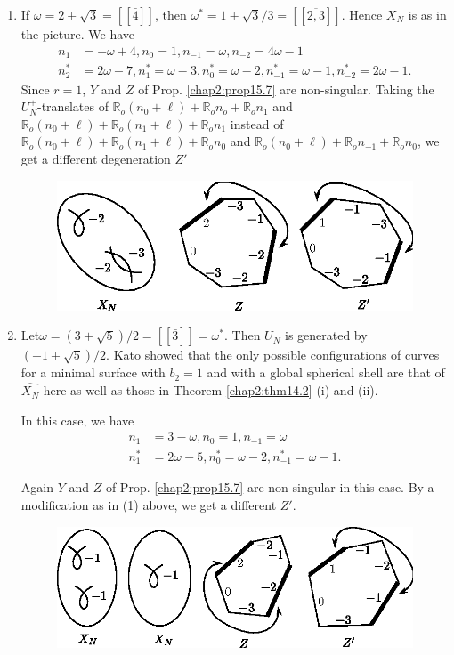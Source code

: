 \begin{examples*}
\begin{enumerate}[(1)]
\item If $\omega =2 + \sqrt{3}=[[\bar{4}]]$, then $\omega^*=1+
  \sqrt{3}/3=[[\overline{2,3}]]$. Hence $X_N$ is as in the picture. We
  have 
\begin{align*}
n_1 & = -\omega +4, n_0=1,n_{-1}=\omega, n_{-2}=4 \omega -1\\
n^*_2 & = 2 \omega-7, n^*_1=\omega-3, n^*_0=\omega-2, n^*_{-1}=\omega-1,
n^*_{-2}=2 \omega -1. 
\end{align*}
Since $r=1$, $Y$ and $Z$ of Prop. \ref{chap2:prop15.7} are
non-singular. Taking the 
$U^+_N$-translates of $\mathbb{R}_o(n_0+
\ell)+\mathbb{R}_on_o+\mathbb{R}_on_1$ and $\mathbb{R}_o(n_0+
\ell)+\mathbb{R}_o(n_1+\ell)+\mathbb{R}_on_1$ instead of
$\mathbb{R}_o(n_0+ \ell)+\mathbb{R}_o(n_1+ \ell)+\mathbb{R}_on_0$ and
$\mathbb{R}_o(n_0+\ell)+\mathbb{R}_on_{-1}+\mathbb{R}_on_0$, we get a
different degeneration $Z'$  
\begin{figure}[H]
\centering 
\includegraphics{vol58-fig/fig58-84.eps} 
\end{figure}

\item Let\pageoriginale $\omega = (3 + \sqrt{5}) /2 = [[\bar{3}]] =
  \omega^*$. Then $U_N$ is generated by $(-1 +\sqrt{5})/2$. Kato
  showed that the only possible configurations of curves for a minimal
  surface with $b_2 = 1$ and with a global spherical shell are that of
  $\hat{X_N}$ here as well as those in Theorem \ref{chap2:thm14.2} (i) and (ii). 

In this case, we have 
\begin{align*}
n_1 & = 3 - \omega , n_0  = 1, n_{-1} = \omega \\ 
n^*_1 & =  2\omega -5, n^*_0 = \omega -2, n^*_{-1} = \omega -1. 
\end{align*}

Again $Y$ and $Z$ of Prop. \ref{chap2:prop15.7} are non-singular in
this case. By a modification as in (1) above, we get a different
$Z'$. 
\begin{figure}[H]
\centering 
\includegraphics{vol58-fig/fig58-85.eps} 
\end{figure}


\end{enumerate}
\end{examples*}
